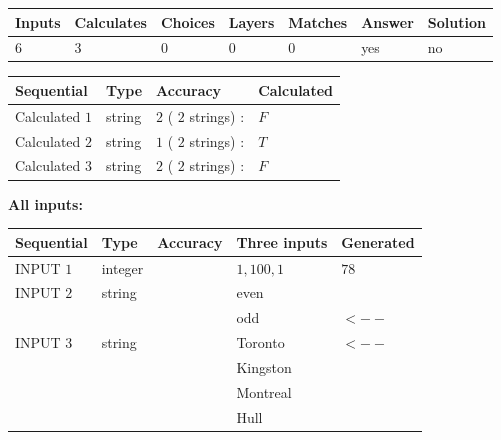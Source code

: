 \documentclass[12pt]{article}
\begin{document}
   
\noindent\begin{tabular}{|l|l|l|l|l|l|l|}
 \hline
Inputs & Calculates & Choices & Layers & Matches & Answer & Solution \\ \hline
           6 & 
           3 & 
           0
  & 
           0 & 
           0 & 
  yes & 
  no 
  \\ \hline
 \end{tabular}
   
   
   
   
\noindent{}
   
   
  
  
\noindent\begin{tabular}{|l|l|l|l|}
\hline
 Sequential & Type & Accuracy & Calculated \\ 
\hline
 
 
  Calculated $           1$ & string & $           2 $ ( $          2 $ strings)
 : 
 & $F$
 \\  \hline  
 
 
  Calculated $           2$ & string & $           1 $ ( $          2 $ strings)
 : 
 & $T$
 \\  \hline  
 
 
  Calculated $           3$ & string & $           2 $ ( $          2 $ strings)
 : 
 & $F$
 \\  \hline  
 \end{tabular}
   
   
   
   
\noindent\vspace{0.1in}\hspace{-0.08in} {\textbf{\Large{All inputs: }}}
   
   
  
  
\noindent\begin{tabular}{|l|l|l|l|l|}
\hline
 Sequential & Type & Accuracy & Three inputs & Generated \\ 
\hline
 
 
  INPUT $           1$ & integer &  & $
 1
 , 
 100
 , 
 1
 $ & $ 78 $ 
 \\  \hline  
 
 
  INPUT $           2$ & string & & 
 even & 
  \\
  & & & 
 odd & 
  $ <-- $ 
 \\  \hline  
 
 
  INPUT $           3$ & string & & 
 Toronto & 
  $ <-- $ 
  \\
  & & & 
 Kingston & 
  \\
  & & & 
 Montreal & 
  \\
  & & & 
 Hull & 
 \\  \hline  
 \end{tabular}
   
\end{document}
